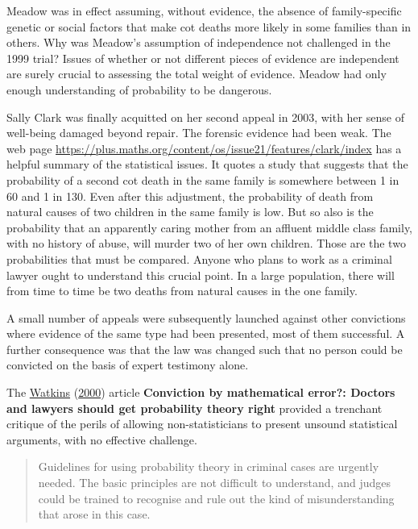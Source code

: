 \documentclass[
  10pt,
  b5paper]{book}
\begin{document}
Meadow was in effect assuming, without evidence, the
absence of family-specific genetic or social factors that
make cot deaths more likely in some families than in others.
Why was Meadow's assumption of independence not challenged
in the 1999 trial? Issues of whether or not different pieces
of evidence are independent are surely crucial to assessing
the total weight of evidence. Meadow had only enough
understanding of probability to be dangerous.

Sally Clark was finally acquitted on her second appeal in
2003, with her sense of well-being damaged beyond repair.
The forensic evidence had been weak. The web page
\url{https://plus.maths.org/content/os/issue21/features/clark/index}
has a helpful summary of the statistical issues. It
quotes a study that suggests that the probability of a
second cot death in the same family is somewhere between 1
in 60 and 1 in 130. Even after this adjustment, the
probability of death from natural causes of two children in
the same family is low. But so also is the probability that
an apparently caring mother from an affluent middle class
family, with no history of abuse, will murder two of her own
children. Those are the two probabilities that must be
compared. Anyone who plans to work as a criminal lawyer
ought to understand this crucial point. In a
large population, there will from time to time be two deaths
from natural causes in the one family.

A small number of appeals were subsequently launched against
other convictions where evidence of the same type had been
presented, most of them successful. A further consequence
was that the law was changed such that no person could be
convicted on the basis of expert testimony alone.

The \protect\hyperlink{ref-watkins2000conviction}{Watkins} (\protect\hyperlink{ref-watkins2000conviction}{2000}) article \textbf{Conviction by mathematical
error?: Doctors and lawyers should get probability theory right}
provided a trenchant critique of the perils of allowing
non-statisticians to present unsound statistical arguments, with
no effective challenge.

\begin{quote}
Guidelines for using probability theory in criminal cases are urgently needed. The basic principles are not difficult to understand, and judges could be trained to recognise and rule out the kind of misunderstanding that arose in this case.
\end{quote}
\end{document}

